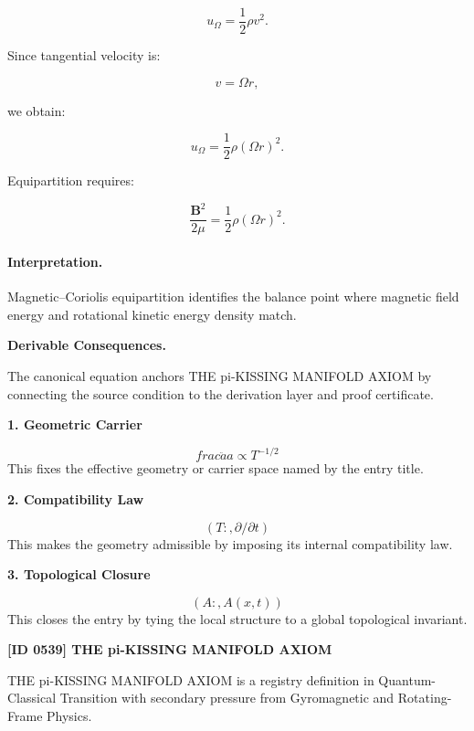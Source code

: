 \begin{equation}
u_{\Omega}
=
\frac{1}{2}\rho v^2 .
\end{equation}

Since tangential velocity is:

\begin{equation}
v=\Omega r,
\end{equation}

we obtain:

\begin{equation}
u_{\Omega}
=
\frac{1}{2}\rho(\Omega r)^2 .
\end{equation}

Equipartition requires:

\begin{equation}
\boxed{
\frac{\mathbf{B}^2}{2\mu}
=
\frac{1}{2}\rho(\Omega r)^2 .
}
\end{equation}

\paragraph{Interpretation.}
Magnetic--Coriolis equipartition identifies the balance point where magnetic field energy and rotational kinetic energy density match.

\par\vspace{0.35em}
\noindent\textbf{Derivable Consequences.}\quad
\begingroup
\footnotesize
\raggedright
The canonical equation anchors THE pi-KISSING MANIFOLD AXIOM by connecting the source condition to the derivation layer and proof certificate.
\par\endgroup

\noindent\textbf{1. Geometric Carrier}\par
\[
frac{\ddot{a}}{a} \propto T^{-1/2}
\]
\noindent This fixes the effective geometry or carrier space named by the entry title.\par
\noindent\textbf{2. Compatibility Law}\par
\[
(T:,\partial/\partial t)
\]
\noindent This makes the geometry admissible by imposing its internal compatibility law.\par
\noindent\textbf{3. Topological Closure}\par
\[
(A:,A(x,t))
\]
\noindent This closes the entry by tying the local structure to a global topological invariant.\par

\clearpage
\noindent\textbf{[ID 0539] THE pi-KISSING MANIFOLD AXIOM}\par
\vspace{0.35em}
\begingroup\small
{}
THE pi-KISSING MANIFOLD AXIOM is a registry definition in Quantum-Classical Transition with secondary pressure from Gyromagnetic and Rotating-Frame Physics.

